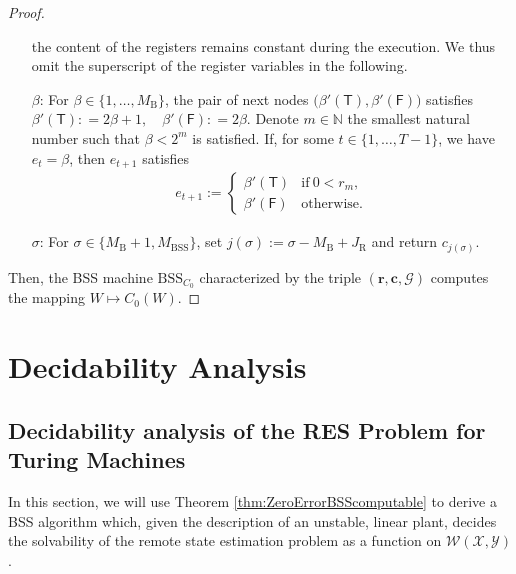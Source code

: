 \documentclass[conference]{IEEEtran}
\def\X{{\mathcal X}}
\def\Y{{\mathcal Y}}
\def\G{{\mathcal G}}
\def\W{{\mathcal W}}
\def\NN{{\mathbb N}}
\newcommand{\BSS}{\mathrm{BSS}}
\newcommand{\revision}[1]{}
\begin{document}
\begin{proof}
\begin{enumerate}
											the content of the registers remains constant during the execution. We thus omit the superscript of the
											register variables in the following.
										\item[\(\beta\)\hspace{1pt}:] 
											For \(\beta \in \{1,\ldots, M_\mathrm{B}\}\), the pair of next nodes \(\big(\beta'(\mathsf{T}),\beta'(\mathsf{F})\big)\) satisfies
											\(	\beta'(\mathsf{T}) :    =  2\beta + 1, \quad
												\beta'(\mathsf{F}) :    =  2\beta.
											\)
											Denote \(m\in\NN\) the smallest natural number such that \(\beta < 2^m\) is satisfied. If, for some \(t\in\{1,\ldots, T-1\}\), we have
											\(e_t = \beta\), then \(e_{t+1}\) satisfies
											\begin{align*}   e_{t+1} := \begin{cases}	\beta'(\mathsf{T}) &\text{if}~ 0 < r_m,\\
																						\beta'(\mathsf{F}) &\text{otherwise}.
																		\end{cases}
											\end{align*}
										\item[\(\sigma\)\hspace{1pt}:] For \(\sigma \in \{M_\mathrm{B} +1, M_\BSS\}\), set \(j(\sigma) := \sigma - M_\mathrm{B} + J_\mathrm{R}\) 
											and return \(c_{j(\sigma)}\).
					\end{enumerate}
					Then, the BSS machine \(\BSS_{C_0}\) characterized by the triple \((\bm{r}, \bm{c}, \G)\) computes the mapping \(W\mapsto C_0(W)\).
	\end{proof}
	
	\revision{ Semi-algebraic sets!}

\section{Decidability Analysis}	\label{sec:DecidingRemoteStateEstimationOnBSS}
	
	\subsection{Decidability analysis of the RES Problem for Turing Machines}
	In this section, we will use Theorem \ref{thm:ZeroErrorBSScomputable} to derive a BSS algorithm which, given the description of an unstable, linear plant,
	decides the solvability of the remote state estimation problem as a function on \(\W(\X,\Y)\).
	
\end{document}
